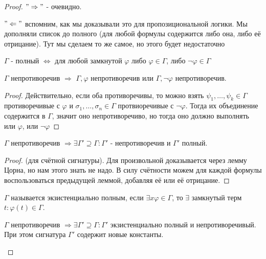 \begin{proof}
    $"\Rightarrow"$ - очевидно.

    $"\Leftarrow"$ вспомним, как мы доказывали это для пропозициональной логики. Мы дополняли список до полного (для любой формулы содержится либо она, либо её отрицание).
    Тут мы сделаем то же самое, но этого будет недостаточно

    $\Gamma$ - полный $\Leftrightarrow$ для любой замкнутой $\varphi$ либо $\varphi \in \Gamma$, либо $\neg \varphi \in \Gamma$


    \begin{lemma}
        $\Gamma$ непротиворечив $\Rightarrow$ $\Gamma, \varphi$ непротиворечив или $\Gamma, \neg \varphi$ непротиворечив.
    \end{lemma}

    \begin{proof}
        Действительно, если оба противоречивы, то можно взять $\psi_1, \dots, \psi_k \in \Gamma$ противоречивые с $\varphi$ и $\sigma_1, \dots, \sigma_n \in \Gamma$ протвиоречивые с $\neg \varphi$.
        Тогда их объединение содержится в $\Gamma$, значит оно непротиворечиво, но тогда оно должно выполнять или $\varphi$, или $\neg \varphi$
    \end{proof}

    \begin{lemma}
        $\Gamma$ непротиворечив $\Rightarrow \exists \Gamma' \supseteq \Gamma : \Gamma'$ - непротиворечив и $\Gamma'$ полный.
    \end{lemma}

    \begin{proof}
        (для счётной сигнатуры). Для произвольной доказывается через лемму Цорна, но нам этого знать не надо.
        В силу счётности можем для каждой формулы воспользоваться предыдущей леммой, добавляя её или её отрицание.
    \end{proof}

    \begin{conj}
        $\Gamma$ называется экзистенциально полным, если $\exists x \varphi \in \Gamma$, то $\exists$ замкнутый терм $t : \varphi(t) \in \Gamma$.
    \end{conj}

    \begin{lemma}
        $\Gamma$ непротиворечив $\Rightarrow \exists \Gamma' \supseteq \Gamma : \Gamma'$ экзистенциально полный и непротиворечивый. 
        При этом сигнатура $\Gamma'$ содержит новые константы.
    \end{lemma}


\end{proof}
